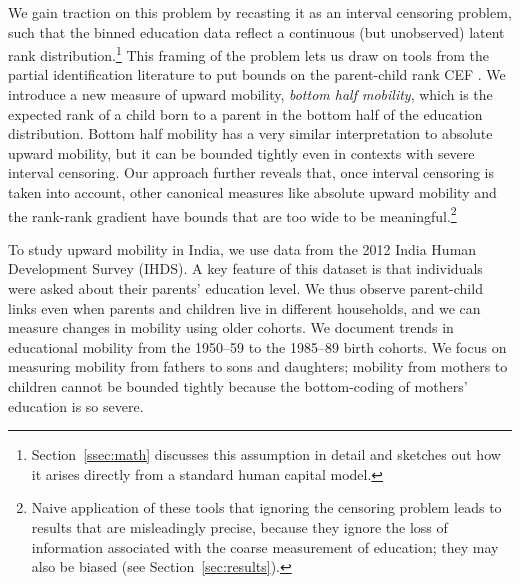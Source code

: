 \documentclass[12pt,letterpaper]{article}
\numberwithin{equation}{section}
\begin{document}
We gain traction on this problem by recasting it as an interval censoring problem, such that the binned education data reflect a continuous (but unobserved) latent rank distribution.\footnote{Section~\ref{ssec:math} discusses this assumption in detail and sketches out how it arises directly from a standard human capital model.} This framing of the problem lets us draw on tools from the partial identification literature to put bounds on the parent-child rank CEF \cite{manski2002,nra2020mort}. We introduce a new measure of upward mobility, \textit{bottom half mobility}, which is the expected rank of a child born to a parent in the bottom half of the education distribution. Bottom half mobility has a very similar interpretation to absolute upward mobility, but it can be bounded tightly even in contexts with severe interval censoring. Our approach further reveals that, once interval censoring is taken into account, other canonical measures like absolute upward mobility and the rank-rank gradient have bounds that are too wide to be meaningful.\footnote{Naive application of these tools that ignoring the censoring problem leads to results that are misleadingly precise, because they ignore the loss of information associated with the coarse measurement of education; they may also be biased (see Section~\ref{sec:results}).}

To study upward mobility in India, we use data from the 2012 India Human Development Survey (IHDS). A key feature of this dataset is that individuals were asked about their parents' education level. We thus observe parent-child links even when parents and children live in different households, and we can measure changes in mobility using older cohorts. We document trends in educational mobility from the 1950--59 to the 1985--89 birth cohorts. We focus on measuring mobility from fathers to sons and daughters; mobility from mothers to children cannot be bounded tightly because the bottom-coding of mothers' education is so severe.
\end{document}
